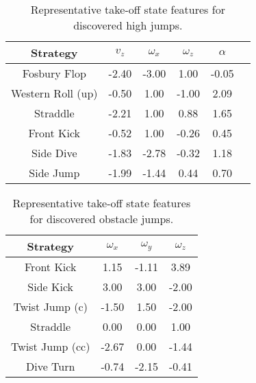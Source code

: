\begin{table}[t]
\centering
\caption{Representative take-off state features for discovered high jumps.}
\begin{tabular}{|c|c|c|c|c|c|} 
\hline
Strategy & $v_z$ & $\omega_x$ & $\omega_z$ & $\alpha$ \\ 
\hline
Fosbury Flop & -2.40 & -3.00 & 1.00 & -0.05 \\
\hline
Western Roll (up) & -0.50 & 1.00 & -1.00 & 2.09 \\
\hline
Straddle & -2.21 & 1.00 & 0.88 & 1.65 \\
\hline
Front Kick & -0.52 & 1.00 & -0.26 & 0.45 \\
\hline
Side Dive & -1.83 & -2.78 & -0.32 & 1.18 \\
\hline
Side Jump & -1.99 & -1.44 & 0.44 & 0.70 \\
\hline
\end{tabular}
\label{tb:take-off-states}
\end{table}


\begin{table}[t]
\centering
\caption{Representative take-off state features for discovered obstacle jumps.}
\begin{tabular}{|c|c|c|c|} 
\hline
Strategy & $\omega_x$ & $\omega_y$ & $\omega_z$ \\ 
\hline
Front Kick & 1.15 & -1.11 & 3.89 \\
\hline
Side Kick & 3.00 & 3.00 & -2.00 \\
\hline
Twist Jump (c) & -1.50 & 1.50 & -2.00 \\
\hline
Straddle & 0.00 & 0.00 & 1.00  \\
\hline
Twist Jump (cc) & -2.67 & 0.00 & -1.44 \\
\hline
Dive Turn & -0.74 & -2.15 & -0.41 \\
\hline
\end{tabular}
\label{tb:take-off-states-box}
\end{table}

